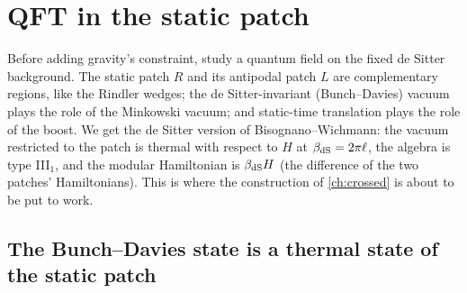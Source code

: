 \chapter{QFT in the static patch}\label{ch:static_patch}

\begin{physmotiv}
Before adding gravity's constraint, study a quantum field on the fixed de Sitter background. The static patch $R$ and its antipodal patch $L$ are complementary regions, like the Rindler wedges; the de Sitter-invariant (Bunch--Davies) vacuum plays the role of the Minkowski vacuum; and static-time translation plays the role of the boost. We get the de Sitter version of Bisognano--Wichmann: the vacuum restricted to the patch is thermal with respect to $H$ at $\beta_{\rm dS}=2\pi\ell$, the algebra is type III$_1$, and the modular Hamiltonian is $\beta_{\rm dS}H$ (the difference of the two patches' Hamiltonians). This is where the construction of \cref{ch:crossed} is about to be put to work.
\end{physmotiv}

\section{The Bunch--Davies state is a thermal state of the static patch}

